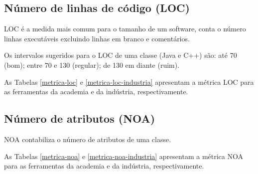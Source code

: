 \subsection{Número de linhas de código (LOC)}

LOC é a medida mais comum para o tamanho de um software, conta o número linhas
executáveis excluindo linhas em branco e comentários.

Os intervalos sugeridos para o LOC de uma classe (Java e C++) são: até 70
(bom); entre 70 e 130 (regular); de 130 em diante (ruim).

As Tabelas \ref{metrica-loc} e \ref{metrica-loc-industria} apresentam a
métrica LOC para as ferramentas da academia e da indústria, respectivamente.



\subsection{Número de atributos (NOA)}

NOA contabiliza o número de atributos de uma classe.

As Tabelas \ref{metrica-noa} e \ref{metrica-noa-industria} apresentam a
métrica NOA para as ferramentas da academia e da indústria, respectivamente.



